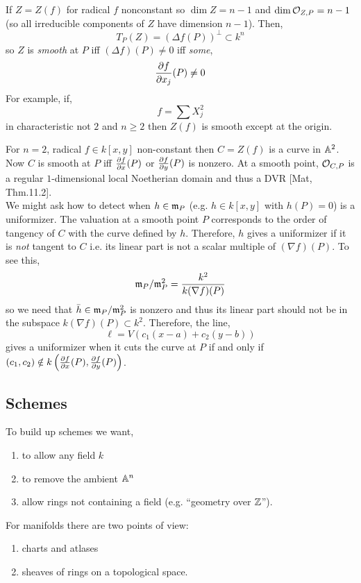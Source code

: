 \documentclass[12pt]{article}
\begin{document}
\begin{example}
If $Z = Z(f)$ for radical $f$ nonconstant so $\dim{Z} = n-1$ and $\dim{\mathcal{O}_{Z, P}} = n  -1$ (so all irreducible components of $Z$ have dimension $n-1$). Then,
\[ T_P(Z) = (\Delta f(P))^\perp \subset k^n \]
so $Z$ is \textit{smooth} at $P$ iff $(\Delta f)(P) \neq 0$ iff \textit{some},
\[ \frac{\partial{f}}{\partial{x_j}}(P) \neq 0 \]
For example, if,
\[ f = \sum X_j^2 \]
in characteristic not $2$ and $n \ge 2$ then $Z(f)$ is smooth except at the origin.
\end{example}

\begin{example}
For $n = 2$, radical $f \in k[x,y]$ non-constant then $C = Z(f)$ is a curve in $\mathbb{A}^2$. Now $C$ is smooth at $P$ iff $\frac{\partial{f}}{\partial{x}}(P)$ or $\frac{\partial{f}}{\partial{y}}(P)$ is nonzero. At a smooth point, $\mathcal{O}_{C, P}$ is a regular $1$-dimensional local Noetherian domain and thus a DVR [Mat, Thm.11.2]. 
\bigskip\\
We might ask how to detect when $h \in \mathfrak{m}_{P}$ (e.g. $h \in k[x,y]$ with $h(P) = 0$) is a uniformizer. The valuation at a smooth point $P$ corresponds to the order of tangency of $C$ with the curve defined by $h$. Therefore, $h$ gives a uniformizer if it is \textit{not} tangent to $C$ i.e. its linear part is not a scalar multiple of $(\nabla f)(P)$. To see this,
\[ \mathfrak{m}_P / \mathfrak{m}_P^2 = \frac{k^2}{k (\nabla f)(P)} \]
so we need that $\bar{h} \in \mathfrak{m}_P / \mathfrak{m}_P^2$ is nonzero and thus its linear part should not be in the subspace $k (\nabla f)(P) \subset k^2$. Therefore, the line,
\[ \ell = V(c_1 (x-a) + c_2(y - b)) \]
gives a uniformizer when it cuts the curve at $P$ if and only if $(c_1, c_2) \notin k \left( \frac{\partial{f}}{\partial{x}}(P), \frac{\partial{f}}{\partial{y}}(P) \right)$.
\end{example}

\subsection{Schemes}

To build up schemes we want,
\begin{enumerate}
\item to allow any field $k$
\item to remove the ambient $\mathbb{A}^n$
\item allow rings not containing a field (e.g. ``geometry over $\mathbb{Z}$'').
\end{enumerate}
\noindent 
For manifolds there are two points of view:
\begin{enumerate}
\item charts and atlases
\item sheaves of rings on a topological space.
\end{enumerate}
\end{document}
